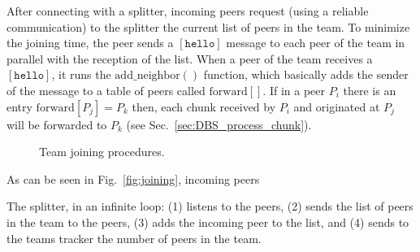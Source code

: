 \label{sec:joining_a_tean}

After connecting with a splitter, incoming peers request (using a
reliable communication) to the splitter the current list of peers in
the team. To minimize the joining time, the peer sends a
$[\mathtt{hello}]$ message to each peer of the team in parallel with
the reception of the list. When a peer of the team receives a
$[\mathtt{hello}]$, it runs the $\mathrm{add}\_\mathrm{neighbor}()$
function, which basically adds the sender of the message to a table of
peers called $\mathrm{forward}[]$. If in a peer $P_i$ there is an
entry $\mathrm{forward}[P_j]=P_k$ then, each chunk received by $P_i$
and originated at $P_j$ will be forwarded to $P_k$ (see
Sec.~\ref{sec:DBS_process_chunk}).


\begin{figure*}
   \caption{Team joining
    procedures.\label{fig:joining_a_team}}
\end{figure*}

As can be seen in Fig.~\ref{fig:joining}, incoming peers 

The splitter, in an infinite loop: (1) listens to the peers, (2) sends
the list of peers in the team to the peers, (3) adds the incoming peer
to the list, and (4) sends to the teams tracker the number of peers
in the team.
